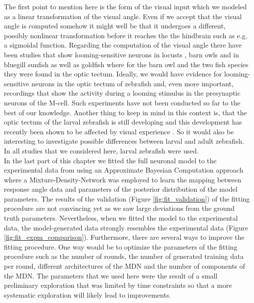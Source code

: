 \documentclass[a4paper,10pt,hidelinks]{scrreprt}
\begin{document}
    The first point to mention here is the form of the visual input which we modeled as a linear transformation of the visual angle.
    Even if we accept that the visual angle is computed somehow it might well be that it undergoes a different, possibly nonlinear transformation before it reaches the the hindbrain such as e.g. a sigmoidal function.
    Regarding the computation of the visual angle there have been studies that show looming-sensitive neurons in locusts \citep{Hatsopoulos1995}, barn owls \citep{Mysore2010} and in bluegill sunfish as well as goldfish \citep{Gallagher2006} where for the barn owl and the two fish species they were found in the optic tectum.
    Ideally, we would have evidence for looming-sensitive neurons in the optic tectum of zebrafish and, even more important, recordings that show the activity during a looming stimulus in the presynaptic neurons of the M-cell.
    Such experiments have not been conducted so far to the best of our knowledge.
    Another thing to keep in mind in this context is, that the optic tectum of the larval zebrafish is still developing and this development has recently been shown to be affected by visual experience \citep{Avitan2017}.
    So it would also be interesting to investigate possible differences between larval and adult zebrafish.
    In all studies that we considered here, larval zebrafish were used.\\
    In the last part of this chapter we fitted the full neuronal model to the experimental data from \cite{Bhattacharyya2017} using an Approximate Bayesian Computation approach where a Mixture-Density-Network was employed to learn the mapping between response angle data and parameters of the posterior distribution of the model parameters.
    The results of the validation (Figure \ref{fig:fit_validation}) of the fitting procedure are not convincing yet as we saw large deviations from the ground truth parameters.
    Nevertheless, when we fitted the model to the experimental data, the model-generated data strongly resembles the experimental data (Figure \ref{fig:fit_expm_comparison}).
    Furthermore, there are several ways to improve the fitting procedure.
    One way would be to optimize the parameters of the fitting procedure such as the number of rounds, the number of generated training data per round, different architectures of the MDN and the number of components of the MDN.
    The parameters that we used here were the result of a small preliminary exploration that was limited by time constraints so that a more systematic exploration will likely lead to improvements.\\
\end{document}
